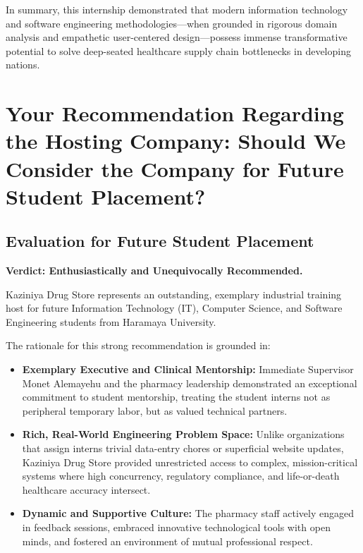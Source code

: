 In summary, this internship demonstrated that modern information technology and software engineering methodologies—when grounded in rigorous domain analysis and empathetic user-centered design—possess immense transformative potential to solve deep-seated healthcare supply chain bottlenecks in developing nations.

\section{Your Recommendation Regarding the Hosting Company: Should We Consider the Company for Future Student Placement?}

\subsection{Evaluation for Future Student Placement}
\textbf{Verdict: Enthusiastically and Unequivocally Recommended.}\par
Kaziniya Drug Store represents an outstanding, exemplary industrial training host for future Information Technology (IT), Computer Science, and Software Engineering students from Haramaya University. 

The rationale for this strong recommendation is grounded in:
\begin{itemize}
    \item \textbf{Exemplary Executive and Clinical Mentorship:} Immediate Supervisor Monet Alemayehu and the pharmacy leadership demonstrated an exceptional commitment to student mentorship, treating the student interns not as peripheral temporary labor, but as valued technical partners.
    \item \textbf{Rich, Real-World Engineering Problem Space:} Unlike organizations that assign interns trivial data-entry chores or superficial website updates, Kaziniya Drug Store provided unrestricted access to complex, mission-critical systems where high concurrency, regulatory compliance, and life-or-death healthcare accuracy intersect.
    \item \textbf{Dynamic and Supportive Culture:} The pharmacy staff actively engaged in feedback sessions, embraced innovative technological tools with open minds, and fostered an environment of mutual professional respect.
\end{itemize}

